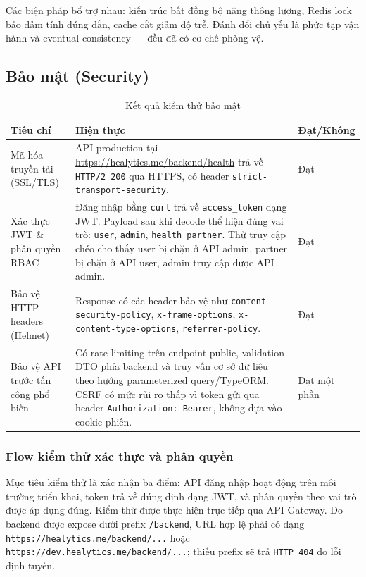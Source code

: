 Các biện pháp bổ trợ nhau: kiến trúc bất đồng bộ nâng thông lượng, Redis lock bảo đảm tính đúng đắn, cache cắt giảm độ trễ. Đánh đổi chủ yếu là phức tạp vận hành và eventual consistency --- đều đã có cơ chế phòng vệ.

\subsection{Bảo mật (Security)}

\begin{table}[H]
\centering
\begin{tabularx}{\textwidth}{|p{}|X|p{}|}
\hline
\textbf{Tiêu chí} & \textbf{Hiện thực} & \textbf{Đạt/Không} \\
\hline
Mã hóa truyền tải (SSL/TLS) & API production tại \url{https://healytics.me/backend/health} trả về \texttt{HTTP/2 200} qua HTTPS, có header \texttt{strict-transport-security}. & Đạt \\
\hline
Xác thực JWT \& phân quyền RBAC & Đăng nhập bằng \texttt{curl} trả về \texttt{access\_token} dạng JWT. Payload sau khi decode thể hiện đúng vai trò: \texttt{user}, \texttt{admin}, \texttt{health\_partner}. Thử truy cập chéo cho thấy user bị chặn ở API admin, partner bị chặn ở API user, admin truy cập được API admin. & Đạt \\
\hline
Bảo vệ HTTP headers (Helmet) & Response có các header bảo vệ như \texttt{content-security-policy}, \texttt{x-frame-options}, \texttt{x-content-type-options}, \texttt{referrer-policy}. & Đạt \\
\hline
Bảo vệ API trước tấn công phổ biến & Có rate limiting trên endpoint public, validation DTO phía backend và truy vấn cơ sở dữ liệu theo hướng parameterized query/TypeORM. CSRF có mức rủi ro thấp vì token gửi qua header \texttt{Authorization: Bearer}, không dựa vào cookie phiên. & Đạt một phần \\
\hline
\end{tabularx}
\caption{Kết quả kiểm thử bảo mật}
\end{table}

\subsubsection{Flow kiểm thử xác thực và phân quyền}
Mục tiêu kiểm thử là xác nhận ba điểm: API đăng nhập hoạt động trên môi trường triển khai, token trả về đúng định dạng JWT, và phân quyền theo vai trò được áp dụng đúng. Kiểm thử được thực hiện trực tiếp qua API Gateway. Do backend được expose dưới prefix \texttt{/backend}, URL hợp lệ phải có dạng \texttt{https://healytics.me/backend/...} hoặc \texttt{https://dev.healytics.me/}\allowbreak\texttt{backend/...}; thiếu prefix sẽ trả \texttt{HTTP 404} do lỗi định tuyến.

